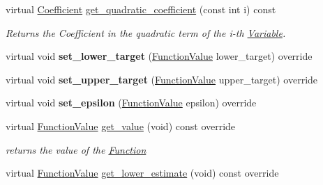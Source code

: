 \begin{Indent}
\begin{DoxyCompactItemize}
virtual \mbox{\hyperlink{class_s_m_spp__di__unipi__it_1_1_d_quad_function_a1fa0f848dbb8d52dc62a1adfee1a1f90}{Coefficient}} \mbox{\hyperlink{class_s_m_spp__di__unipi__it_1_1_d_quad_function_a3d6a5a28eab862ab685773c02d8b87e3}{get\+\_\+quadratic\+\_\+coefficient}} (const int i) const
\begin{DoxyCompactList}\small\item\em Returns the Coefficient in the quadratic term of the i-\/th \mbox{\hyperlink{class_s_m_spp__di__unipi__it_1_1_variable}{Variable}}. \end{DoxyCompactList}\item 
\mbox{\label{class_s_m_spp__di__unipi__it_1_1_d_quad_function_a03b641948b8509966efdfed3a324e9fc}} 
virtual void {\bfseries set\+\_\+lower\+\_\+target} (\mbox{\hyperlink{class_s_m_spp__di__unipi__it_1_1_function_a9ad432406b609e28d340f73e9474bffe}{Function\+Value}} lower\+\_\+target) override
\item 
\mbox{\label{class_s_m_spp__di__unipi__it_1_1_d_quad_function_a171dce6f75a51dcf2a1e6b844645f924}} 
virtual void {\bfseries set\+\_\+upper\+\_\+target} (\mbox{\hyperlink{class_s_m_spp__di__unipi__it_1_1_function_a9ad432406b609e28d340f73e9474bffe}{Function\+Value}} upper\+\_\+target) override
\item 
\mbox{\label{class_s_m_spp__di__unipi__it_1_1_d_quad_function_a701a55557c30ec1e0561d129fb7c640d}} 
virtual void {\bfseries set\+\_\+epsilon} (\mbox{\hyperlink{class_s_m_spp__di__unipi__it_1_1_function_a9ad432406b609e28d340f73e9474bffe}{Function\+Value}} epsilon) override
\item 
virtual \mbox{\hyperlink{class_s_m_spp__di__unipi__it_1_1_function_a9ad432406b609e28d340f73e9474bffe}{Function\+Value}} \mbox{\hyperlink{class_s_m_spp__di__unipi__it_1_1_d_quad_function_ae74d8c7f3dc6100820de31198c77ca25}{get\+\_\+value}} (void) const override
\begin{DoxyCompactList}\small\item\em returns the value of the \mbox{\hyperlink{class_s_m_spp__di__unipi__it_1_1_function}{Function}} \end{DoxyCompactList}\item 
virtual \mbox{\hyperlink{class_s_m_spp__di__unipi__it_1_1_function_a9ad432406b609e28d340f73e9474bffe}{Function\+Value}} \mbox{\hyperlink{class_s_m_spp__di__unipi__it_1_1_d_quad_function_a33520123d0919481e4f7cc5bc6da28a9}{get\+\_\+lower\+\_\+estimate}} (void) const override

\end{DoxyCompactItemize}
\end{Indent}

